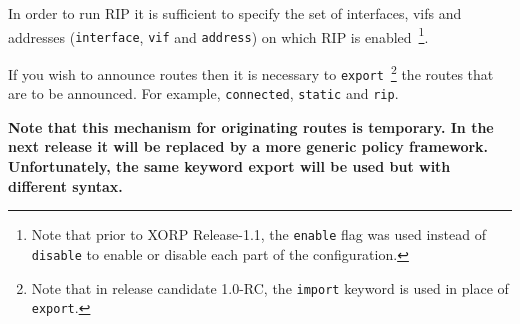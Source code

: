In order to run RIP it is sufficient to specify the set of interfaces,
vifs and addresses ({\tt interface}, {\tt vif} and {\tt address}) on
which RIP is enabled~\footnote{Note that prior to XORP Release-1.1,
the {\tt enable} flag was used instead of {\tt disable} to enable
or disable each part of the configuration.}.

If you wish to announce routes then it is necessary to
{\tt export}~\footnote{Note that in release candidate 1.0-RC, the {\tt import}
 keyword is used in place of {\tt export}.}
the routes that are to be announced. For example, {\tt connected},
{\tt static} and {\tt rip}.

{\bf Note that this mechanism for originating
routes is temporary. In the next release it will be replaced by
a more generic policy framework. Unfortunately, the same keyword
{\stt export} will be used but with different syntax.}

\vspace{0.1in}
\noindent{}

